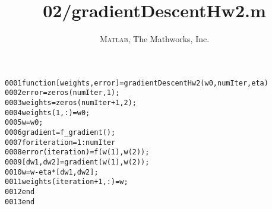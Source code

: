 \documentclass[a4paper,10pt]{article}
\title{02/gradientDescentHw2.m}
\author{\textsc{Matlab}, The Mathworks, Inc.}
\begin{document}
\maketitle
\begin{alltt}
0001 \textcolor{keyword}{function} [weights, error] = gradientDescentHw2(w0, numIter, eta)
0002     error = zeros(numIter, 1);
0003     weights = zeros(numIter + 1, 2);
0004     weights(1, :) = w0;
0005     w = w0;
0006     gradient = f\_gradient();
0007     \textcolor{keyword}{for} iteration = 1:numIter
0008         error(iteration) = f(w(1), w(2));
0009         [dw1, dw2] = gradient(w(1), w(2));
0010         w = w - eta * [dw1, dw2];
0011         weights(iteration + 1, :) = w;
0012     \textcolor{keyword}{end}
0013 \textcolor{keyword}{end}
\end{alltt}
\end{document}
